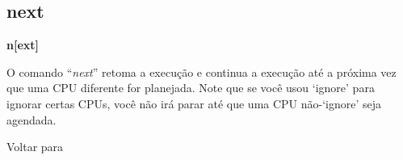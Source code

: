 \documentclass[letterpaper,10pt,brazil]{sphinxmanual}
\begin{document}
\subsection{next}
\label{debugger/execution:debugger-command-next}\label{debugger/execution:next}
\begin{DUlineblock}{0em}
\item[]
\begin{DUlineblock}{\DUlineblockindent}
\item[] \textbf{n{[}ext{]}}
\item[] 
\end{DUlineblock}
\item[] O comando ``\emph{next}'' retoma a execução e continua a execução até a próxima vez que uma CPU diferente for planejada. Note que se você usou `ignore' para ignorar certas CPUs, você não irá parar até que uma CPU não-`ignore' seja agendada.
\item[] 
\item[] Voltar para {\hyperref[debugger/execution:debugger\string-execution\string-list]{}}
\end{DUlineblock}
\begin{quote}
\label{debugger/execution:debugger-command-focus}\end{quote}
\end{document}
